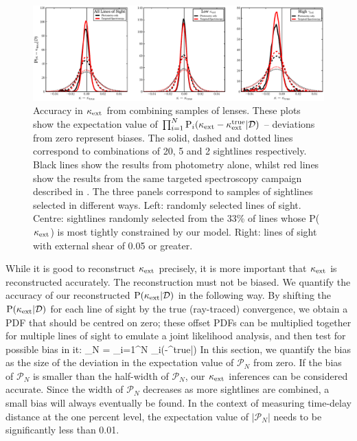 \documentclass[useAMS,usenatbib,a4paper]{mn2e}
\begin{document}
\begin{figure}
\includegraphics[width=\textwidth]{figs/biasplots.eps}
\caption{Accuracy in $\kappa_{\rm ext}$ from combining samples of lenses.  These plots
show the expectation value of $\prod_{i=1}^N {\rm P}_i(\kappa_{\rm ext}-\kappa_{\rm ext}^{\rm true}|{\mathcal{D}})$ --
deviations from zero represent biases. The solid, dashed and dotted lines
correspond to combinations of  20, 5 and 2 sightlines respectively. Black
lines show the results \infered from photometry alone, whilst red lines show
the results  from the same targeted spectroscopy campaign described in 
. The three panels correspond to samples of
sightlines selected in different ways. Left: randomly selected lines of
sight.  Centre: sightlines randomly selected from the 33\% of lines whose
P($\kappa_{\rm ext}$) is most tightly constrained by our model.  Right: lines of sight
with external shear of 0.05 or greater.}
\label{fig:biasplots}
\end{figure}

While it is good to reconstruct $\kappa_{\rm ext}$ precisely, it is more important that
$\kappa_{\rm ext}$ is reconstructed accurately. The reconstruction must not be biased. 
We quantify the accuracy of our reconstructed ${\rm P}(\kappa_{\rm ext}|{\mathcal{D}})$ in the
following way. By shifting the \infered ${\rm P}(\kappa_{\rm ext}|{\mathcal{D}})$ for each line of
sight by the true (ray-traced) convergence, we obtain a  PDF that should be
centred on zero; these offset PDFs can be multiplied together for multiple
lines of sight to emulate a joint likelihood analysis, and then test for
possible bias in it:
\be
\label{eq:bias}
_N = \prod_{i=1}^N \pr_i(\kappax-\kappax^{\rm true}|\data)
\ee
In this section, we quantify the bias as the size of the deviation in the
expectation value of $\mathcal{P}_N$ from zero. If the bias of $\mathcal{P}_N$
is smaller than the half-width of $\mathcal{P}_N$, our $\kappa_{\rm ext}$ inferences
can be considered accurate. Since the width of $\mathcal{P}_N$ decreases as
more sightlines are combined, a small bias will always 
eventually be found. In the context of measuring time-delay distance at the 
one percent level, the expectation value of $|\mathcal{P}_N|$ needs to be 
significantly less than 0.01. 
\end{document}
